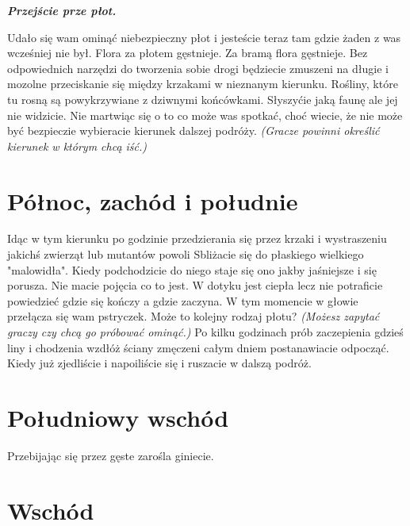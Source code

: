 \documentclass{article}
\begin{document}
    \bigskip
    \normalfont
    \emph{\textbf{Przejście prze płot.}}

    Udało się wam ominąć niebezpieczny płot i jesteście teraz tam gdzie żaden z was wcześniej nie był. Flora za płotem gęstnieje. Za bramą flora gęstnieje. Bez odpowiednich narzędzi do tworzenia sobie drogi będziecie zmuszeni na długie i mozolne przeciskanie się między krzakami w nieznanym kierunku. Rośliny, które tu rosną są powykrzywiane z dziwnymi końcówkami. Słyszyćie jaką faunę ale jej nie widzicie. Nie martwiąc się o to co może was spotkać, choć wiecie, że nie może być bezpieczie wybieracie kierunek dalszej podróży. \emph{(Gracze powinni określić kierunek w którym chcą iść.)}

    \section{Północ, zachód i południe}

    Idąc w tym kierunku po godzinie przedzierania się przez krzaki i wystraszeniu jakichś zwierząt lub mutantów powoli Sbliżacie się do płaskiego wielkiego "malowidła". Kiedy podchodzicie do niego staje się ono jakby jaśniejsze i się porusza. Nie macie pojęcia co to jest. W dotyku jest ciepła lecz nie potraficie powiedzieć gdzie się kończy a gdzie zaczyna. W tym momencie w głowie przełącza się wam pstryczek. Może to kolejny rodzaj płotu? \emph{(Możesz zapytać graczy czy chcą go próbować ominąć.)} Po kilku godzinach prób zaczepienia gdzieś liny i chodzenia wzdłóż ściany zmęczeni całym dniem postanawiacie odpocząć. Kiedy już zjedliście i napoiliście się i ruszacie w dalszą podróż.

    \section{Południowy wschód}

    Przebijając się przez gęste zarośla giniecie.

    \section{Wschód}


    
\end{document}
